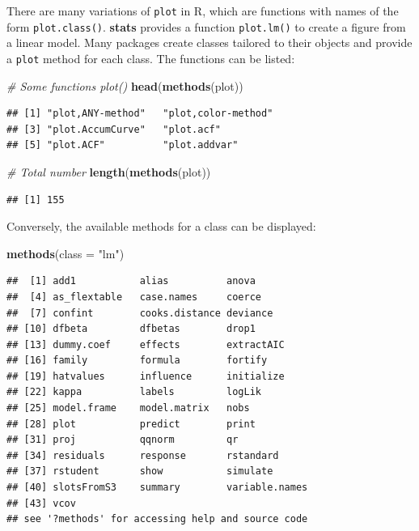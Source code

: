 \documentclass[
  12pt,
  american,
  a4paper,
  extrafontsizes,onecolumn,openright
  ]{memoir}
\newenvironment{Shaded}{\begin{snugshade}}{\end{snugshade}}
\newcommand{\AttributeTok}[1]{\textcolor[rgb]{0.13,0.29,0.53}{#1}}
\newcommand{\CommentTok}[1]{\textcolor[rgb]{0.56,0.35,0.01}{\textit{#1}}}
\newcommand{\FunctionTok}[1]{\textcolor[rgb]{0.13,0.29,0.53}{\textbf{#1}}}
\newcommand{\NormalTok}[1]{#1}
\newcommand{\StringTok}[1]{\textcolor[rgb]{0.31,0.60,0.02}{#1}}
\begin{document}
\normalsize

There are many variations of \texttt{plot} in R, which are functions with names of the form \texttt{plot.class()}.
\textbf{stats} provides a function \texttt{plot.lm()} to create a figure from a linear model.
Many packages create classes tailored to their objects and provide a \texttt{plot} method for each class.
The functions can be listed:

\scriptsize

\begin{Shaded}
\begin{Highlighting}[]
\CommentTok{\# Some functions plot()}
\FunctionTok{head}\NormalTok{(}\FunctionTok{methods}\NormalTok{(plot))}
\end{Highlighting}
\end{Shaded}

\begin{verbatim}
## [1] "plot,ANY-method"   "plot,color-method"
## [3] "plot.AccumCurve"   "plot.acf"         
## [5] "plot.ACF"          "plot.addvar"
\end{verbatim}

\begin{Shaded}
\begin{Highlighting}[]
\CommentTok{\# Total number}
\FunctionTok{length}\NormalTok{(}\FunctionTok{methods}\NormalTok{(plot))}
\end{Highlighting}
\end{Shaded}

\begin{verbatim}
## [1] 155
\end{verbatim}

\normalsize

Conversely, the available methods for a class can be displayed:

\scriptsize

\begin{Shaded}
\begin{Highlighting}[]
\FunctionTok{methods}\NormalTok{(}\AttributeTok{class =} \StringTok{"lm"}\NormalTok{)}
\end{Highlighting}
\end{Shaded}

\begin{verbatim}
##  [1] add1           alias          anova         
##  [4] as_flextable   case.names     coerce        
##  [7] confint        cooks.distance deviance      
## [10] dfbeta         dfbetas        drop1         
## [13] dummy.coef     effects        extractAIC    
## [16] family         formula        fortify       
## [19] hatvalues      influence      initialize    
## [22] kappa          labels         logLik        
## [25] model.frame    model.matrix   nobs          
## [28] plot           predict        print         
## [31] proj           qqnorm         qr            
## [34] residuals      response       rstandard     
## [37] rstudent       show           simulate      
## [40] slotsFromS3    summary        variable.names
## [43] vcov          
## see '?methods' for accessing help and source code
\end{verbatim}
\end{document}
